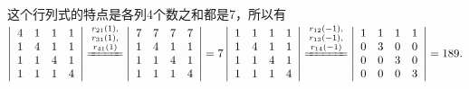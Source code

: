 \begin{solution}
    这个行列式的特点是各列4个数之和都是7，所以有
    \small
    $ \left|\begin{array}{cccc}
            4 & 1 & 1 & 1 \\
            1 & 4 & 1 & 1 \\
            1 & 1 & 4 & 1 \\
            1 & 1 & 1 & 4
        \end{array}\right|
        \xlongequal{\substack{r_{21}(1),\\r_{31}(1),\\r_{41}(1)}}
        \left|\begin{array}{cccc}
            7 & 7 & 7 & 7 \\
            1 & 4 & 1 & 1 \\
            1 & 1 & 4 & 1 \\
            1 & 1 & 1 & 4
        \end{array}\right| =7
        \left|\begin{array}{cccc}
            1 & 1 & 1 & 1 \\
            1 & 4 & 1 & 1 \\
            1 & 1 & 4 & 1 \\
            1 & 1 & 1 & 4
        \end{array}\right|
        \xlongequal{\substack{r_{12}(-1),\\ r_{13}(-1),\\r_{14}(-1)}}
        \left|\begin{array}{cccc}
            1 & 1 & 1 & 1 \\
            0 & 3 & 0 & 0 \\
            0 & 0 & 3 & 0 \\
            0 & 0 & 0 & 3
        \end{array}\right| =189.$
\end{solution}


